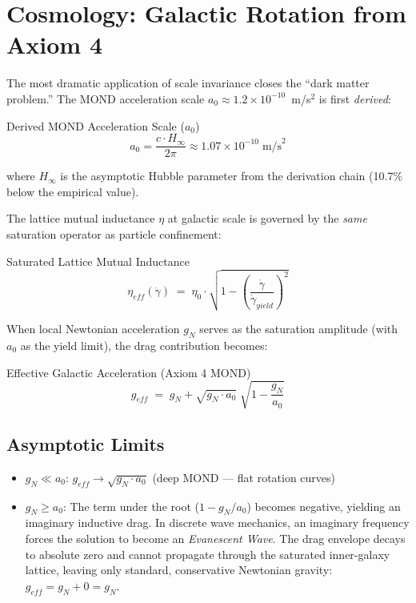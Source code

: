 
\chapter{Cosmology: Galactic Rotation from Axiom 4}
\label{ch:cosmology_v7}

The most dramatic application of scale invariance closes the
``dark matter problem.''  The MOND acceleration scale
$a_0 \approx 1.2 \times 10^{-10}$~m/s$^2$ is first \textit{derived}:
\begin{resultbox}{Derived MOND Acceleration Scale ($a_0$)}
\begin{equation}
    a_0 = \frac{c \cdot H_\infty}{2\pi}
    \approx 1.07 \times 10^{-10}\;\text{m/s}^2
    \label{eq:a0_derived}
\end{equation}
\end{resultbox}
where $H_\infty$ is the asymptotic Hubble parameter from the derivation
chain (10.7\% below the empirical value).

The lattice mutual inductance $\eta$ at galactic scale is governed
by the \textit{same} saturation operator as particle confinement:
\begin{resultbox}{Saturated Lattice Mutual Inductance}
\begin{equation}
    \eta_{eff}(\dot\gamma) \;=\; \eta_0 \cdot
    \sqrt{1 - \left(\frac{\dot\gamma}{\dot\gamma_{yield}}\right)^{\!2}}
    \label{eq:galactic_inductance}
\end{equation}
\end{resultbox}
When local Newtonian acceleration $g_N$ serves as the saturation
amplitude (with $a_0$ as the yield limit), the drag contribution
becomes:
\begin{resultbox}{Effective Galactic Acceleration (Axiom 4 MOND)}
\begin{equation}
    g_{eff} \;=\; g_N + \sqrt{g_N \cdot a_0}\;
    \sqrt{1 - \frac{g_N}{a_0}}
    \label{eq:saturation_mond}
\end{equation}
\end{resultbox}

\section{Asymptotic Limits}

\begin{itemize}
    \item $g_N \ll a_0$: $g_{eff} \to \sqrt{g_N \cdot a_0}$
          \quad (deep MOND --- flat rotation curves)
    \item $g_N \ge a_0$: The term under the root ($1 - g_N/a_0$) becomes negative, yielding an imaginary inductive drag. In discrete wave mechanics, an imaginary frequency forces the solution to become an \textit{Evanescent Wave}. The drag envelope decays to absolute zero and cannot propagate through the saturated inner-galaxy lattice, leaving only standard, conservative Newtonian gravity:  $g_{eff} = g_N + 0 = g_N$.
\end{itemize}

